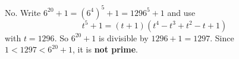 No. Write $6^{20}+1=\left(6^4\right)^5+1=1296^5+1$ and use
\[t^5+1=(t+1)\left(t^4-t^3+t^2-t+1\right)\]
with $t=1296$. So $6^{20}+1$ is divisible by $1296+1=1297$. Since $1<1297<6^{20}+1$, it is \textbf{not prime}.
